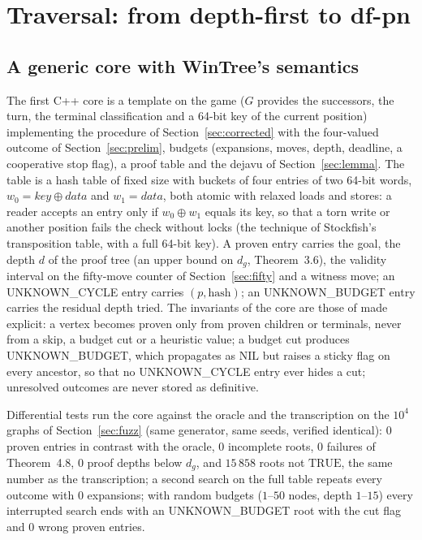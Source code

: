 \documentclass{article}
\theoremstyle{plain}
\theoremstyle{definition}
\theoremstyle{remark}
\newcommand{\TRUE}{\ensuremath{\mathrm{TRUE}}}
\newcommand{\NIL}{\ensuremath{\mathrm{NIL}}}
\newcommand{\UC}{\textsf{UNKNOWN\_CYCLE}}
\newcommand{\UB}{\textsf{UNKNOWN\_BUDGET}}
\begin{document}
\section{Traversal: from depth-first to df-pn}\label{sec:dfpn}

\subsection{A generic core with WinTree's semantics}

The first C++ core is a template on the game ($G$ provides the successors, the turn, the terminal classification and a 64-bit key of the current position) implementing the procedure of Section~\ref{sec:corrected} with the four-valued outcome of Section~\ref{sec:prelim}, budgets (expansions, moves, depth, deadline, a cooperative stop flag), a proof table and the dejavu of Section~\ref{sec:lemma}. The table is a hash table of fixed size with buckets of four entries of two 64-bit words, $w_0 = \mathit{key} \oplus \mathit{data}$ and $w_1 = \mathit{data}$, both atomic with relaxed loads and stores: a reader accepts an entry only if $w_0 \oplus w_1$ equals its key, so that a torn write or another position fails the check without locks (the technique of Stockfish's transposition table, with a full 64-bit key). A proven entry carries the goal, the depth $d$ of the proof tree (an upper bound on $d_g$, Theorem~3.6), the validity interval on the fifty-move counter of Section~\ref{sec:fifty} and a witness move; an \UC{} entry carries $(p, \text{hash})$; an \UB{} entry carries the residual depth tried. The invariants of the core are those of \cite{romano2026} made explicit: a vertex becomes proven only from proven children or terminals, never from a skip, a budget cut or a heuristic value; a budget cut produces \UB{}, which propagates as \NIL{} but raises a sticky flag on every ancestor, so that no \UC{} entry ever hides a cut; unresolved outcomes are never stored as definitive.

Differential tests run the core against the oracle and the transcription on the $10^4$ graphs of Section~\ref{sec:fuzz} (same generator, same seeds, verified identical): $0$ proven entries in contrast with the oracle, $0$ incomplete roots, $0$ failures of Theorem~4.8, $0$ proof depths below $d_g$, and $15\,858$ roots not \TRUE{}, the same number as the transcription; a second search on the full table repeats every outcome with $0$ expansions; with random budgets ($1$--$50$ nodes, depth $1$--$15$) every interrupted search ends with an \UB{} root with the cut flag and $0$ wrong proven entries.
\end{document}
